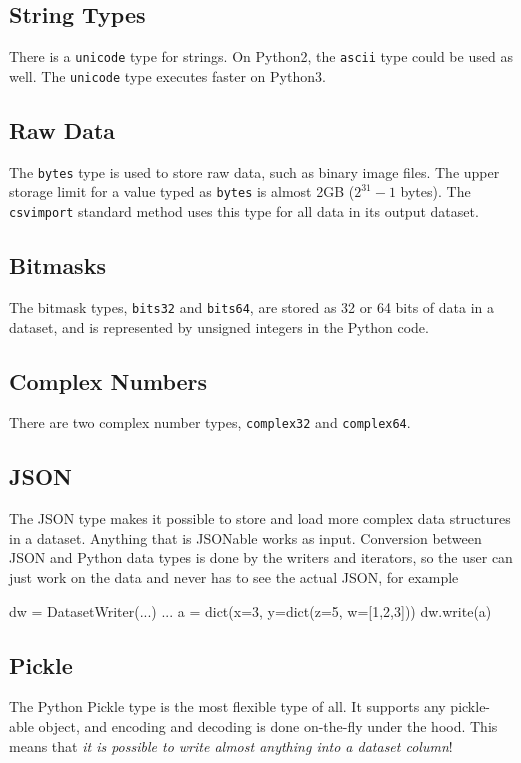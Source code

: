\subsection{String Types}
There is a \texttt{unicode} type for strings.  On Python2, the
\texttt{ascii} type could be used as well.  The \texttt{unicode}
type executes faster on Python3.


\subsection{Raw Data}

The \texttt{bytes} type is used to store raw data, such as binary
image files.  The upper storage limit for a value typed
as \texttt{bytes} is almost 2GB ($2^{31}-1$ bytes).
The \texttt{csvimport} standard method uses this type for all data in
its output dataset.


\subsection{Bitmasks}
The bitmask types, \texttt{bits32} and \texttt{bits64}, are stored as
32 or 64 bits of data in a dataset, and is represented by unsigned
integers in the Python code.


\subsection{Complex Numbers}
There are two complex number types, \texttt{complex32}
and \texttt{complex64}.


\subsection{JSON}
The JSON type makes it possible to store and load more complex data
structures in a dataset.  Anything that is JSONable works as input.
Conversion between JSON and Python data types is done by the writers
and iterators, so the user can just work on the data and never has to
see the actual JSON, for example
\begin{python}
    dw = DatasetWriter(...)
    ...
    a = dict(x=3, y=dict(z=5, w=[1,2,3]))
    dw.write(a)
\end{python}



\subsection{Pickle}
The Python Pickle type is the most flexible type of all.  It supports
any pickle-able object, and encoding and decoding is done on-the-fly
under the hood.  This means that \textsl{it is possible to write almost
anything into a dataset column}!



